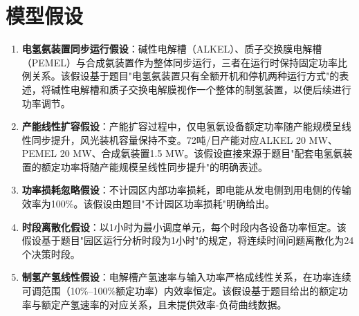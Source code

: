 \section{模型假设}

\begin{enumerate}
\item \textbf{电氢氨装置同步运行假设}：碱性电解槽（ALKEL）、质子交换膜电解槽（PEMEL）与合成氨装置作为整体同步运行，三者在运行时保持固定功率比例关系。该假设基于题目"电氢氨装置只有全额开机和停机两种运行方式"的表述，将碱性电解槽和质子交换电解膜视作一个整体的制氢装置，以便后续进行功率调节。

\item \textbf{产能线性扩容假设}：产能扩容过程中，仅电氢氨设备额定功率随产能规模呈线性同步提升，风光装机容量保持不变。72吨/日产能对应ALKEL 20 MW、PEMEL 20 MW、合成氨装置1.5 MW。该假设直接来源于题目"配套电氢氨装置的额定功率将随产能规模呈线性同步提升"的明确表述。

\item \textbf{功率损耗忽略假设}：不计园区内部功率损耗，即电能从发电侧到用电侧的传输效率为100\%。该假设由题目"不计园区功率损耗"明确给出。

\item \textbf{时段离散化假设}：以1小时为最小调度单元，每个时段内各设备功率恒定。该假设基于题目"园区运行分析时段为1小时"的规定，将连续时间问题离散化为24个决策时段。

\item \textbf{制氢产氢线性假设}：电解槽产氢速率与输入功率严格成线性关系，在功率连续可调范围（10\%--100\%额定功率）内效率恒定。该假设基于题目给出的额定功率与额定产氢速率的对应关系，且未提供效率-负荷曲线数据。
\end{enumerate}
